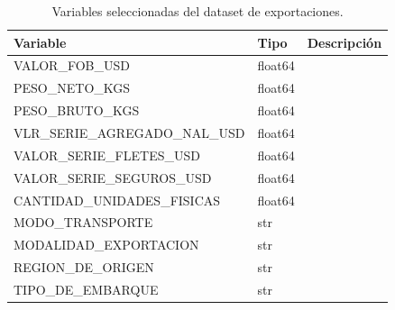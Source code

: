 \begin{table}
\caption{Variables seleccionadas del dataset de exportaciones.}
\label{tab:variables_seleccionadas}
\begin{tabular}{lll}
\toprule
Variable & Tipo & Descripción \\
\midrule
VALOR_FOB_USD & float64 &  \\
PESO_NETO_KGS & float64 &  \\
PESO_BRUTO_KGS & float64 &  \\
VLR_SERIE_AGREGADO_NAL_USD & float64 &  \\
VALOR_SERIE_FLETES_USD & float64 &  \\
VALOR_SERIE_SEGUROS_USD & float64 &  \\
CANTIDAD_UNIDADES_FISICAS & float64 &  \\
MODO_TRANSPORTE & str &  \\
MODALIDAD_EXPORTACION & str &  \\
REGION_DE_ORIGEN & str &  \\
TIPO_DE_EMBARQUE & str &  \\
\bottomrule
\end{tabular}
\end{table}
